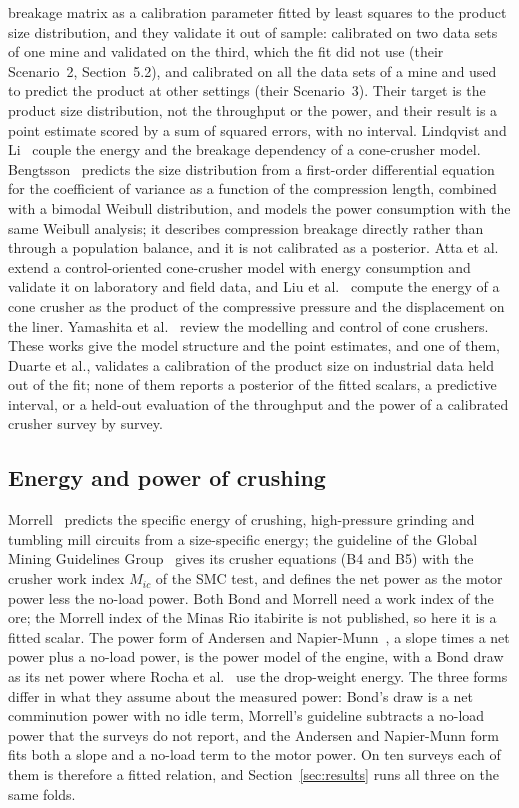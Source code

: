 \documentclass[journal]{IEEEtran}
\begin{document}
breakage matrix as a calibration parameter fitted by least squares to the product size distribution, and they validate it
out of sample: calibrated on two data sets of one mine and validated on the third, which the fit did not use (their
Scenario~2, Section~5.2), and calibrated on all the data sets of a mine and used to predict the product at other settings
(their Scenario~3). Their target is the product size distribution, not the throughput or the power, and their result is a
point estimate scored by a sum of squared errors, with no interval. Lindqvist and Li~\cite{lindq} couple the energy and the
breakage dependency of a cone-crusher model. Bengtsson~\cite{bengtsson} predicts the size distribution from a
first-order differential equation for the coefficient of variance as a function of the compression length, combined with
a bimodal Weibull distribution, and models the power consumption with the same Weibull analysis; it describes compression
breakage directly rather than through a population balance, and it is not calibrated as a posterior. Atta et al.~\cite{atta} extend a
control-oriented cone-crusher model with energy consumption and validate it on laboratory and field data, and Liu et
al.~\cite{liu} compute the energy of a cone crusher as the product of the compressive pressure and the displacement on
the liner. Yamashita et al.~\cite{yamashita} review the modelling and control of cone crushers. These works give the
model structure and the point estimates, and one of them, Duarte et al., validates a calibration of the product size on
industrial data held out of the fit; none of them reports a posterior of the fitted scalars, a predictive interval, or a
held-out evaluation of the throughput and the power of a calibrated crusher survey by survey.

\subsection{Energy and power of crushing}

Morrell~\cite{morrell} predicts the specific energy of crushing, high-pressure grinding and tumbling mill circuits from a
size-specific energy; the guideline of the Global Mining Guidelines Group~\cite{gmsg} gives its crusher equations (B4
and B5) with the crusher work index $M_{ic}$ of the SMC test, and defines the net power as the motor power less the
no-load power. Both Bond and Morrell need a work index of the ore; the Morrell index of the Minas Rio itabirite is not
published, so here it is a fitted scalar. The power form of Andersen and Napier-Munn~\cite{andersen}, a slope times a net
power plus a no-load power, is the power model of the engine, with a Bond draw as its net power where Rocha et
al.~\cite{rocha} use the drop-weight energy. The three forms differ in what they assume about the measured power:
Bond's draw is a net comminution power with no idle term, Morrell's guideline subtracts a no-load power that the surveys
do not report, and the Andersen and Napier-Munn form fits both a slope and a no-load term to the motor power. On ten
surveys each of them is therefore a fitted relation, and Section~\ref{sec:results} runs all three on the same folds.
\end{document}
